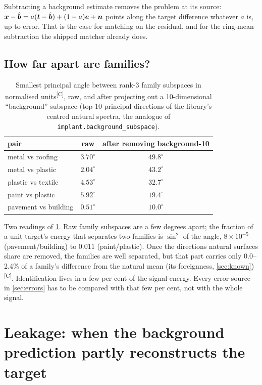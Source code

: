 \documentclass[11pt,a4paper]{article}
\theoremstyle{plain}
\theoremstyle{definition}
\theoremstyle{remark}
\newcommand{\x}{\B{x}}
\newcommand{\bh}{\hat{\B{b}}}
\newcommand{\tv}{\B{t}}
\newcommand{\ev}{\B{e}}
\newcommand{\nv}{\B{n}}
\newcommand{\comp}{\textsuperscript{\textsf{\scriptsize[C]}}}
\begin{document}
Subtracting a background estimate removes the problem at its source: $\x-\bh=a(\tv-\bh)+(1-a)\ev+\nv$ points along the
target difference whatever $a$ is, up to error. That is the case for matching on the residual, and for the ring-mean
subtraction the shipped matcher already does.

\subsection{How far apart are families?}

\begin{table}[ht]
\centering\small
\caption{Smallest principal angle between rank-3 family subspaces in normalised units\comp, raw, and after projecting out
a 10-dimensional ``background'' subspace (top-10 principal directions of the library's centred natural spectra, the
analogue of \texttt{implant.background\_subspace}).}
\label{tab:angles}
\begin{tabular}{@{}lcc@{}}
\toprule
pair & raw & after removing background-10\\
\midrule
metal vs roofing & $3.70^\circ$ & $49.8^\circ$\\
metal vs plastic & $2.04^\circ$ & $43.2^\circ$\\
plastic vs textile & $4.53^\circ$ & $32.7^\circ$\\
paint vs plastic & $5.92^\circ$ & $19.4^\circ$\\
pavement vs building & $0.51^\circ$ & $10.0^\circ$\\
\bottomrule
\end{tabular}
\end{table}

Two readings of \cref{tab:angles}. Raw family subspaces are a few degrees apart; the fraction of a unit target's energy
that separates two families is $\sin^2$ of the angle, $8\times10^{-5}$ (pavement/building) to $0.011$ (paint/plastic).
Once the directions natural surfaces share are removed, the families are well separated, but that part carries only
0.0--2.4\% of a family's difference from the natural mean (its foreignness, \cref{sec:known})\comp. Identification lives in
a few per cent of the signal energy. Every error source in \cref{sec:errors} has to be compared with that few per cent,
not with the whole signal.

\section{Leakage: when the background prediction partly reconstructs the target}
\label{sec:leak}
\end{document}
